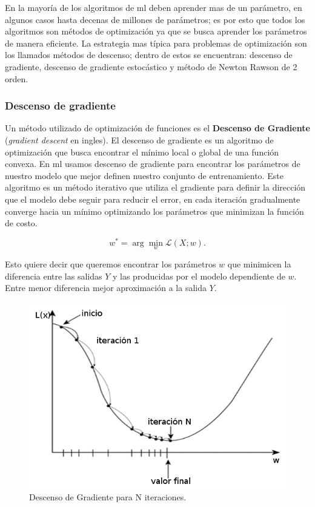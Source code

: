 En la mayoría de los algoritmos de \ac{ml} deben aprender mas de un parámetro, en algunos casos hasta decenas de millones de parámetros; es por esto que todos los algoritmos  son métodos de optimización ya que se busca aprender los parámetros de manera eficiente. La estrategia mas típica para problemas de optimización son los llamados métodos de descenso; dentro de estos se encuentran: descenso de gradiente, descenso de gradiente estocástico y método de Newton Rawson de 2 orden.

\subsubsection{Descenso de gradiente}\label{sub:gradient-desc}
Un método utilizado de optimización de funciones  es el \textbf{Descenso de Gradiente} (\textit{gradient descent} en ingles). El descenso de gradiente es un algoritmo de optimización que busca encontrar el mínimo local o global de una función convexa.  En \ac{ml} usamos descenso de gradiente para encontrar los parámetros de nuestro modelo que mejor definen nuestro conjunto de entrenamiento. Este algoritmo es un método iterativo que utiliza el gradiente para definir la dirección que el modelo debe seguir para reducir el error, en cada iteración gradualmente converge hacia un mínimo optimizando los parámetros que minimizan la función de costo. 


\begin{equation}
w^* =  \arg\min_{w} \mathcal{L}(X; w).
\end{equation}

Esto quiere decir que queremos encontrar los parámetros $w$ que minimicen la diferencia entre las salidas $Y$ y las producidas por el modelo dependiente de $w$. Entre menor  diferencia mejor aproximación a la salida $Y$. 

\begin{figure}[H] \centering
  \includegraphics[scale=0.4,keepaspectratio=true,clip=true]{imagenes/MarcoTeorico/gradient-descent.png}
  \caption{Descenso de Gradiente para N iteraciones.}\label{Fig:gradient-descent}
\end{figure}


